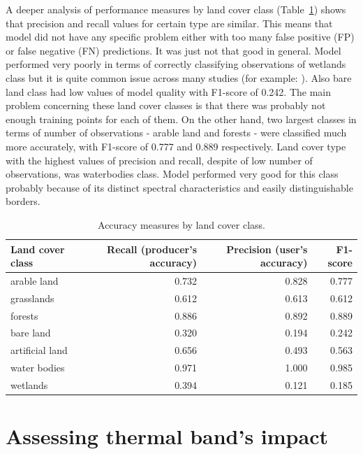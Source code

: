 \documentclass{amuthesis}
\begin{document}
A deeper analysis of performance measures by land cover class
(Table~\ref{tbl-tabela5}) shows that precision and recall values for
certain type are similar. This means that model did not have any
specific problem either with too many false positive (FP) or false
negative (FN) predictions. It was just not that good in general. Model
performed very poorly in terms of correctly classifying observations of
wetlands class but it is quite common issue across many studies (for
example: \textcite{malinowski_automated_2020}). Also bare land class had
low values of model quality with F1-score of 0.242. The main problem
concerning these land cover classes is that there was probably not
enough training points for each of them. On the other hand, two largest
classes in terms of number of observations - arable land and forests -
were classified much more accurately, with F1-score of 0.777 and 0.889
respectively. Land cover type with the highest values of precision and
recall, despite of low number of observations, was waterbodies class.
Model performed very good for this class probably because of its
distinct spectral characteristics and easily distinguishable borders.

\hypertarget{tbl-tabela5}{}
\begin{table}
\caption{\label{tbl-tabela5}Accuracy measures by land cover class. }\tabularnewline

\centering
\begin{tabular}{|>{}l|>{}r|>{}r|>{}r|}
\toprule
\textbf{Land cover class} & \textbf{Recall (producer's accuracy)} & \textbf{Precision (user's accuracy)} & \textbf{F1-score}\\
\midrule
arable land & 0.732 & 0.828 & 0.777\\
\hline
grasslands & 0.612 & 0.613 & 0.612\\
\hline
forests & 0.886 & 0.892 & 0.889\\
\hline
bare land & 0.320 & 0.194 & 0.242\\
\hline
artificial land & 0.656 & 0.493 & 0.563\\
\hline
water bodies & 0.971 & 1.000 & 0.985\\
\hline
wetlands & 0.394 & 0.121 & 0.185\\
\bottomrule
\end{tabular}
\end{table}


\hypertarget{sec-results-therm}{%
\chapter{Assessing thermal band's impact}\label{sec-results-therm}}
\end{document}
